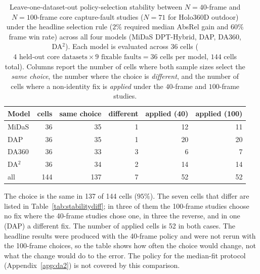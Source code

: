 \documentclass{article}
\newcommand{\absrel}{AbsRel}
\begin{document}
\begin{table}[!htbp]\centering\small
\caption{Leave-one-dataset-out policy-selection stability between $N=40$-frame and $N=100$-frame core capture-fault studies ($N=71$ for Holo360D outdoor) under the headline selection rule ($2\%$ required median \absrel{} gain and $60\%$ frame win rate) across all four models (MiDaS DPT-Hybrid, DAP, DA360, DA$^2$). Each model is evaluated across $36$ cells ($4\text{ held-out core datasets}\times9\text{ fixable faults}=36$ cells per model, $144$ cells total). Columns report the number of cells where both sample sizes select the \emph{same choice}, the number where the choice is \emph{different}, and the number of cells where a non-identity fix is \emph{applied} under the $40$-frame and $100$-frame studies.}\label{tab:stability}
\begin{tabular}{lrrrrr}\toprule
Model & cells & same choice & different & applied (40) & applied (100)\\\midrule
MiDaS & 36 & 35 & 1 & 12 & 11\\
DAP & 36 & 35 & 1 & 20 & 20\\
DA360 & 36 & 33 & 3 & 6 & 7\\
DA$^2$ & 36 & 34 & 2 & 14 & 14\\\midrule
all & 144 & 137 & 7 & 52 & 52\\
\bottomrule\end{tabular}
\end{table}

The choice is the same in 137 of 144 cells ($95\%$). The seven cells that differ are listed in Table~\ref{tab:stabilitydiff}; in three of them the 100-frame studies choose no fix where the 40-frame studies chose one, in three the reverse, and in one (DAP) a different fix. The number of applied cells is 52 in both cases. The headline results were produced with the 40-frame policy and were not rerun with the 100-frame choices, so the table shows how often the choice would change, not what the change would do to the error. The policy for the median-fit protocol (Appendix~\ref{app:da2}) is not covered by this comparison.
\end{document}
